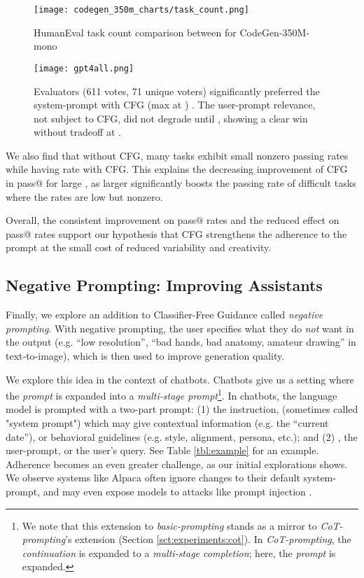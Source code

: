 \documentclass{article}
\begin{document}
\begin{figure}[htp]
  \centering
    \begin{minipage}{.45\linewidth}
        \centering
        \texttt{[image: codegen\_350m\_charts/task\_count.png]}
        \caption{HumanEval task count comparison between  for CodeGen-350M-mono}
        \label{tab:codegen-350-task-count}
    \end{minipage} \hfill
    \begin{minipage}{.45\linewidth}
        \centering
        \texttt{[image: gpt4all.png]}
        \caption{Evaluators (611 votes, 71 unique voters) significantly preferred the system-prompt with CFG (max at ) . The user-prompt relevance, not subject to CFG, did not degrade until , showing a clear win without tradeoff at .}
        \label{fig:gpt4all-human}
    \end{minipage}
\end{figure}

We also find that without CFG, many tasks exhibit small nonzero passing rates while having  rate with CFG. This explains the decreasing improvement of CFG in pass@ for large , as larger  significantly boosts the passing rate of difficult tasks where the rates are low but nonzero.

Overall, the consistent improvement on pass@ rates and the reduced effect on pass@ rates support our hypothesis that CFG strengthens the adherence to the prompt at the small cost of reduced variability and creativity.

\subsection{Negative Prompting: Improving Assistants}
\label{sct:experiments:negative-prompting}

Finally, we explore an addition to Classifier-Free Guidance called \textit{negative prompting}. With negative prompting, the user specifies what they do \textit{not} want in the output (e.g. ``low resolution'', ``bad hands, bad anatomy, amateur drawing'' in text-to-image), which is then used to improve generation quality.

We explore this idea in the context of chatbots. Chatbots give us a setting where the \textit{prompt} is expanded into a \textit{multi-stage prompt}\footnote{We note that this extension to \textit{basic-prompting} stands as a mirror to \textit{CoT-prompting}'s extension (Section \ref{sct:experiments:cot}). In \textit{CoT-prompting}, the \textit{continuation} is expanded to a \textit{multi-stage completion}; here, the \textit{prompt} is expanded.}. In chatbots, the language model is prompted with a two-part prompt: (1) the instruction,  (sometimes called "system prompt") which may give contextual information (e.g. the ``current date''), or behavioral guidelines (e.g. style, alignment, persona, etc.); and (2) , the user-prompt, or the user's query. See Table \ref{tbl:example} for an example. Adherence becomes an even greater challenge, as our initial explorations shows. We observe systems like Alpaca \cite{alpaca,vicuna,gpt4all} often ignore changes to their default system-prompt, and may even expose models to attacks like prompt injection \cite{greshake2023more}. 
\end{document}
